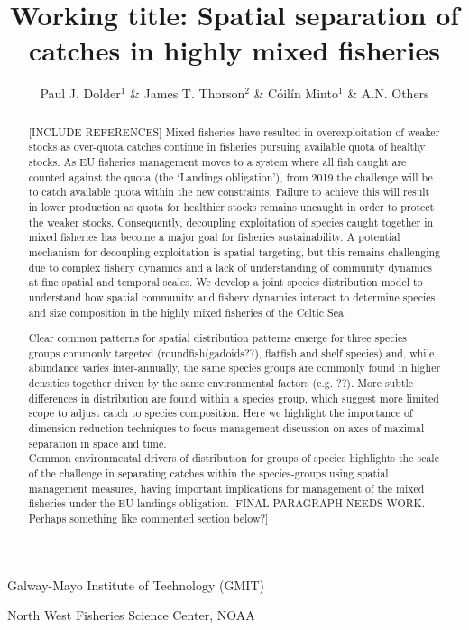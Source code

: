 \documentclass{nature}
\title{Working title: Spatial separation of catches in highly mixed fisheries}
\author{Paul J. Dolder$^1$ \& James T. Thorson$^2$ \& Cóilín Minto$^1$ \& A.N.
Others}
\begin{document}
\maketitle

\begin{affiliations}
\item Galway-Mayo Institute of Technology (GMIT) 
\item North West Fisheries Science Center, NOAA
\end{affiliations}

\begin{linenumbers}

\begin{abstract} 
[INCLUDE REFERENCES] Mixed fisheries have resulted in overexploitation of weaker stocks as
over-quota catches continue in fisheries pursuing available quota of healthy
stocks. As EU fisheries management moves to a system where all fish caught are
counted against the quota (the `Landings obligation'), from 2019 the challenge
will be to catch available quota within the new constraints. Failure to achieve this
will result in lower production as quota for healthier stocks remains
uncaught in order to protect the weaker stocks. Consequently, decoupling
exploitation of species caught together in mixed fisheries has become a
major goal for fisheries sustainability. 
A potential mechanism for decoupling exploitation is spatial targeting, but this remains
challenging due to complex fishery dynamics and a lack of understanding of community dynamics at
fine spatial and temporal scales.  We develop a joint species distribution model to understand how spatial
community and fishery dynamics interact to determine species and size composition in the highly mixed fisheries of the Celtic Sea. 

Clear common patterns for spatial distribution patterns emerge for three
species groups commonly targeted (roundfish(gadoids??), flatfish and shelf species) and,
while abundance varies inter-annually, the same species groups are commonly
found in higher densities together driven by the same environmental factors (e.g. ??).
More subtle differences in distribution are found within a species group, which
suggest more limited scope to adjust catch to species composition. Here we highlight the importance of dimension reduction techniques to focus management discussion on axes of maximal separation in space and time.\\
Common environmental drivers of distribution for groups of species highlights the
scale of the challenge in separating catches within the species-groups using
spatial management measures, having important implications for management of
the mixed fisheries under the EU landings obligation. [FINAL PARAGRAPH NEEDS WORK. Perhaps something like commented section below?]


\end{abstract}
\end{linenumbers}
\end{document}
